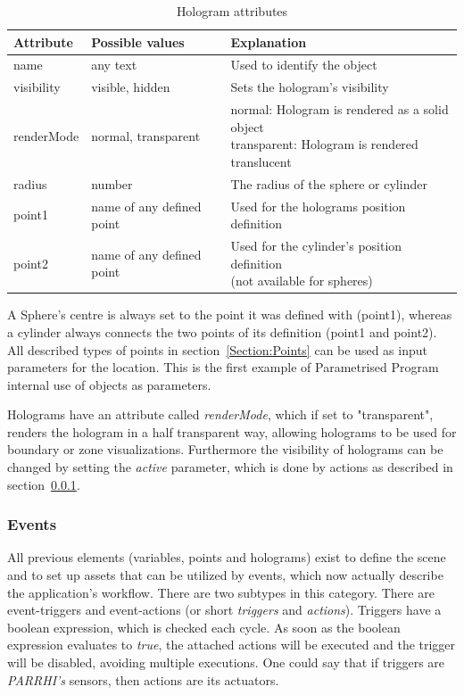 \begin{table}[!htbp]
	\caption{Hologram attributes}
	\label{Table:HologramAttributes}
	\centering
	\begin{tabular}{lll}
		\toprule
		Attribute & Possible values		& Explanation	\\		
		\midrule
		name & any text & Used to identify the object \\
		visibility & visible, hidden & Sets the hologram's visibility \\
		renderMode & normal, transparent & \parbox[t]{10cm}{ normal: Hologram is rendered as a solid object \\ transparent: Hologram is rendered translucent}\\
		radius & number & The radius of the sphere or cylinder \\
		point1 & name of any defined point & Used for the holograms position definition \\
		point2 & name of any defined point & \parbox[t]{10cm}{ Used for the cylinder's position definition \\ (not available for spheres)} \\
		\bottomrule
	\end{tabular}
\end{table}

A Sphere's centre is always set to the point it was defined with (point1), whereas a cylinder always connects the two points of its definition (point1 and point2). All described types of points in section~\ref{Section:Points} can be used as input parameters for the location. This is the first example of Parametrised Program internal use of objects as parameters.

Holograms have an attribute called \textit{renderMode}, which if set to "transparent", renders the hologram in a half transparent way, allowing holograms to be used for boundary or zone visualizations. Furthermore the visibility of holograms can be changed by setting the \textit{active} parameter, which is done by actions as described in section~\ref{Section:Events}.

\subsubsection{Events}\label{Section:Events}
All previous elements (variables, points and holograms) exist to define the scene and to set up assets that can be utilized by events, which now actually describe the application's workflow. There are two subtypes in this category. There are event-triggers and event-actions (or short \textit{triggers} and \textit{actions}). Triggers have a boolean expression, which is checked each cycle. As soon as the boolean expression evaluates to \textit{true}, the attached actions will be executed and the trigger will be disabled, avoiding multiple executions. One could say that if triggers are \textit{PARRHI's} sensors, then actions are its actuators.

